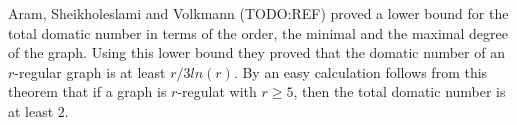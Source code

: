 \begin{remark}
  Aram, Sheikholeslami and Volkmann (TODO:REF) proved a lower bound for the total
  domatic number in terms of the order, the minimal and the maximal degree of the
  graph. Using this lower bound they proved that the domatic number of an $r$-regular graph
  is at least $r/3ln(r)$. By an easy calculation follows from this theorem that
  if a graph is $r$-regulat with $r \ge 5$, then the total domatic number is at least
  $2$.
\end{remark}
